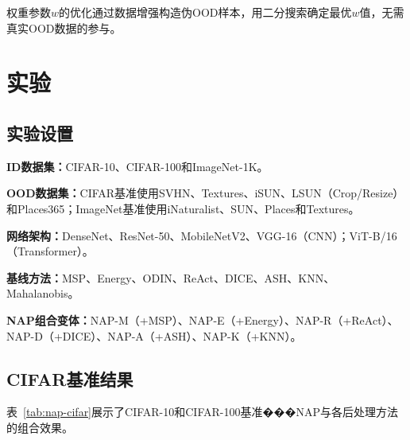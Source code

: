 权重参数$w$的优化通过数据增强构造伪OOD样本\cite{du2022vos}，用二分搜索确定最优$w$值，无需真实OOD数据的参与。


\section{实验}

\subsection{实验设置}

\textbf{ID数据集：}CIFAR-10\cite{krizhevsky2009cifar}、CIFAR-100\cite{krizhevsky2009cifar}和ImageNet-1K\cite{deng2009imagenet}。

\textbf{OOD数据集：}CIFAR基准使用SVHN\cite{netzer2011svhn}、Textures\cite{cimpoi2014texture}、iSUN\cite{xu2015isun}、LSUN（Crop/Resize）\cite{yu2015lsun}和Places365\cite{zhou2017places}；ImageNet基准使用iNaturalist\cite{van2018inaturalist}、SUN\cite{xiao2010sun}、Places\cite{zhou2017places}和Textures\cite{cimpoi2014texture}。

\textbf{网络架构：}DenseNet\cite{huang2017densely}、ResNet-50\cite{he2016deep}、MobileNetV2\cite{sandler2018mobilenetv2}、VGG-16\cite{simonyan2015very}（CNN）；ViT-B/16\cite{dosovitskiy2020image}（Transformer）。

\textbf{基线方法：}MSP\cite{hendrycks2016msp}、Energy\cite{liu2020energy}、ODIN\cite{liang2018odin_confi}、ReAct\cite{sun2021react}、DICE\cite{sun2022dice}、ASH\cite{djurisic2022extremely}、KNN\cite{sun2022knn}、Mahalanobis\cite{lee2018maha_dist}。

\textbf{NAP组合变体：}NAP-M（+MSP）、NAP-E（+Energy）、NAP-R（+ReAct）、NAP-D（+DICE）、NAP-A（+ASH）、NAP-K（+KNN）。%

\subsection{CIFAR基准结果}

表~\ref{tab:nap-cifar}展示了CIFAR-10和CIFAR-100基准���NAP与各后处理方法的组合效果。

\begin{table}[htb]
  \centering
  \caption{CIFAR-10和CIFAR-100基准上NAP与各后处理方法的组合效果}
  \label{tab:nap-cifar}
\end{table}

